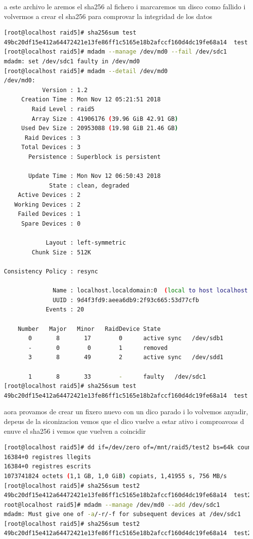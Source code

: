 \documentclass[preprint,11pt]{elsarticle}
\begin{document}
\clearpage
a este archivo le aremos el sha256 al fichero i marcaremos un disco como fallido i volvermos a crear el sha256 para comprovar la integridad de los datos 
\begin{lstlisting}[basicstyle=\tiny, language=bash]
[root@localhost raid5]# sha256sum test 
49bc20df15e412a64472421e13fe86ff1c5165e18b2afccf160d4dc19fe68a14  test
[root@localhost raid5]# mdadm --manage /dev/md0 --fail /dev/sdc1 
mdadm: set /dev/sdc1 faulty in /dev/md0
[root@localhost raid5]# mdadm --detail /dev/md0
/dev/md0:
           Version : 1.2
     Creation Time : Mon Nov 12 05:21:51 2018
        Raid Level : raid5
        Array Size : 41906176 (39.96 GiB 42.91 GB)
     Used Dev Size : 20953088 (19.98 GiB 21.46 GB)
      Raid Devices : 3
     Total Devices : 3
       Persistence : Superblock is persistent

       Update Time : Mon Nov 12 06:50:43 2018
             State : clean, degraded 
    Active Devices : 2
   Working Devices : 2
    Failed Devices : 1
     Spare Devices : 0

            Layout : left-symmetric
        Chunk Size : 512K

Consistency Policy : resync

              Name : localhost.localdomain:0  (local to host localhost.localdomain)
              UUID : 9d4f3fd9:aeea6db9:2f93c665:53d77cfb
            Events : 20

    Number   Major   Minor   RaidDevice State
       0       8       17        0      active sync   /dev/sdb1
       -       0        0        1      removed
       3       8       49        2      active sync   /dev/sdd1

       1       8       33        -      faulty   /dev/sdc1
[root@localhost raid5]# sha256sum test 
49bc20df15e412a64472421e13fe86ff1c5165e18b2afccf160d4dc19fe68a14  test
\end{lstlisting}

aora provamos de crear un fixero nuevo con un dico parado i lo volvemos anyadir, depeus de la siconizacion vemos que el dico vuelve a estar ativo i comproavoas d enuve el sha256 i vemos que vuelven a coincidir 

\begin{lstlisting}[basicstyle=\tiny, language=bash]
[root@localhost raid5]# dd if=/dev/zero of=/mnt/raid5/test2 bs=64k count=16k conv=fdatasync
16384+0 registres llegits
16384+0 registres escrits
1073741824 octets (1,1 GB, 1,0 GiB) copiats, 1,41955 s, 756 MB/s
[root@localhost raid5]# sha256sum test2 
49bc20df15e412a64472421e13fe86ff1c5165e18b2afccf160d4dc19fe68a14  test2
root@localhost raid5]# mdadm --manage /dev/md0 --add /dev/sdc1 
mdadm: Must give one of -a/-r/-f for subsequent devices at /dev/sdc1
[root@localhost raid5]# sha256sum test2 
49bc20df15e412a64472421e13fe86ff1c5165e18b2afccf160d4dc19fe68a14  test2
\end{lstlisting}
\end{document}

